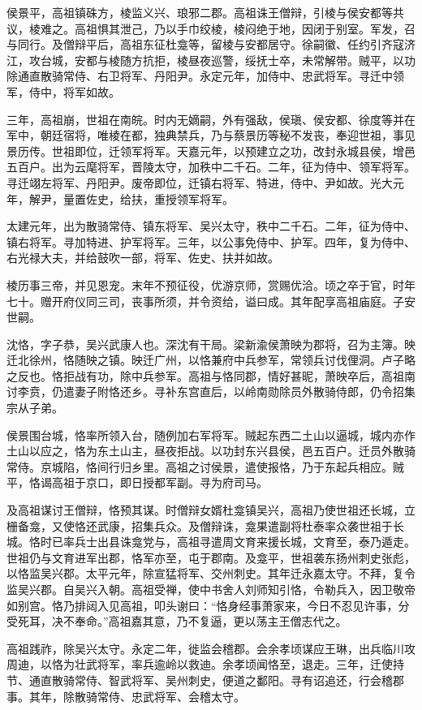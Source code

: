 \documentclass[]{article}
\begin{document}
侯景平，高祖镇硃方，棱监义兴、琅邪二郡。高祖诛王僧辩，引棱与侯安都等共议，棱难之。高祖惧其泄己，乃以手巾绞棱，棱闷绝于地，因闭于别室。军发，召与同行。及僧辩平后，高祖东征杜龛等，留棱与安都居守。徐嗣徽、任约引齐寇济江，攻台城，安都与棱随方抗拒，棱昼夜巡警，绥抚士卒，未常解带。贼平，以功除通直散骑常侍、右卫将军、丹阳尹。永定元年，加侍中、忠武将军。寻迁中领军，侍中，将军如故。

三年，高祖崩，世祖在南皖。时内无嫡嗣，外有强敌，侯瑱、侯安都、徐度等并在军中，朝廷宿将，唯棱在都，独典禁兵，乃与蔡景历等秘不发丧，奉迎世祖，事见景历传。世祖即位，迁领军将军。天嘉元年，以预建立之功，改封永城县侯，增邑五百户。出为云麾将军，晋陵太守，加秩中二千石。二年，征为侍中、领军将军。寻迁翊左将军、丹阳尹。废帝即位，迁镇右将军、特进，侍中、尹如故。光大元年，解尹，量置佐史，给扶，重授领军将军。

太建元年，出为散骑常侍、镇东将军、吴兴太守，秩中二千石。二年，征为侍中、镇右将军。寻加特进、护军将军。三年，以公事免侍中、护军。四年，复为侍中、右光禄大夫，并给鼓吹一部，将军、佐史、扶并如故。

棱历事三帝，并见恩宠。末年不预征役，优游京师，赏赐优洽。顷之卒于官，时年七十。赠开府仪同三司，丧事所须，并令资给，谥曰成。其年配享高祖庙庭。子安世嗣。

沈恪，字子恭，吴兴武康人也。深沈有干局。梁新渝侯萧映为郡将，召为主簿。映迁北徐州，恪随映之镇。映迁广州，以恪兼府中兵参军，常领兵讨伐俚洞。卢子略之反也。恪拒战有功，除中兵参军。高祖与恪同郡，情好甚昵，萧映卒后，高祖南讨李贲，仍遣妻子附恪还乡。寻补东宫直后，以岭南勋除员外散骑侍郎，仍令招集宗从子弟。

侯景围台城，恪率所领入台，随例加右军将军。贼起东西二土山以逼城，城内亦作土山以应之，恪为东土山主，昼夜拒战。以功封东兴县侯，邑五百户。迁员外散骑常侍。京城陷，恪间行归乡里。高祖之讨侯景，遣使报恪，乃于东起兵相应。贼平，恪谒高祖于京口，即日授都军副。寻为府司马。

及高祖谋讨王僧辩，恪预其谋。时僧辩女婿杜龛镇吴兴，高祖乃使世祖还长城，立栅备龛，又使恪还武康，招集兵众。及僧辩诛，龛果遣副将杜泰率众袭世祖于长城。恪时已率兵士出县诛龛党与，高祖寻遣周文育来援长城，文育至，泰乃遁走。世祖仍与文育进军出郡，恪军亦至，屯于郡南。及龛平，世祖袭东扬州刺史张彪，以恪监吴兴郡。太平元年，除宣猛将军、交州刺史。其年迁永嘉太守。不拜，复令监吴兴郡。自吴兴入朝。高祖受禅，使中书舍人刘师知引恪，令勒兵入，因卫敬帝如别宫。恪乃排闼入见高祖，叩头谢曰：``恪身经事萧家来，今日不忍见许事，分受死耳，决不奉命。''高祖嘉其意，乃不复逼，更以荡主王僧志代之。

高祖践祚，除吴兴太守。永定二年，徙监会稽郡。会余孝顷谋应王琳，出兵临川攻周迪，以恪为壮武将军，率兵逾岭以救迪。余孝顷闻恪至，退走。三年，迁使持节、通直散骑常侍、智武将军、吴州刺史，便道之鄱阳。寻有诏追还，行会稽郡事。其年，除散骑常侍、忠武将军、会稽太守。
\end{document}
